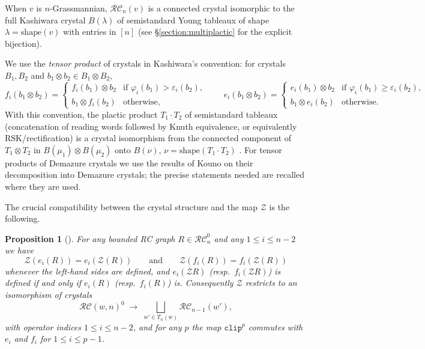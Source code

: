\documentclass{amsart}
\newtheorem{proposition}[lemma]{Proposition}
\theoremstyle{definition}
\theoremstyle{remark}
\numberwithin{equation}{subsection}
\newcommand{\zeromap}{\mathcal{Z}}
\newcommand{\clp}{\mathtt{clip}}
\newcommand{\RC}{\mathcal{RC}}
\begin{document}
When $v$ is $n$-Grassmannian, $\RC_n(v)$ is a connected crystal isomorphic to the full Kashiwara crystal $B(\lambda)$ of semistandard Young tableaux of shape $\lambda=\mathrm{shape}(v)$ with entries in $[n]$ (see \S\ref{section:multiplactic} for the explicit bijection).

We use the \emph{tensor product} of crystals in Kashiwara's convention: for crystals $B_1,B_2$ and $b_1\otimes b_2\in B_1\otimes B_2$,
\begin{equation}\label{eq:tensorrule}
f_i(b_1\otimes b_2) = \begin{cases} f_i(b_1)\otimes b_2 & \text{if }\varphi_i(b_1)>\varepsilon_i(b_2),\\ b_1\otimes f_i(b_2) & \text{otherwise,}\end{cases}
\qquad
e_i(b_1\otimes b_2) = \begin{cases} e_i(b_1)\otimes b_2 & \text{if }\varphi_i(b_1)\geq\varepsilon_i(b_2),\\ b_1\otimes e_i(b_2) & \text{otherwise.}\end{cases}
\end{equation}
With this convention, the plactic product $T_1\cdot T_2$ of semistandard tableaux (concatenation of reading words followed by Knuth equivalence, or equivalently RSK/rectification) is a crystal isomorphism from the connected component of $T_1\otimes T_2$ in $B(\mu_1)\otimes B(\mu_2)$ onto $B(\nu)$, $\nu=\mathrm{shape}(T_1\cdot T_2)$ \cite{kashiwara1993crystal,littelmann1995crystal}. For tensor products of Demazure crystals we use the results of Kouno \cite{kouno2020decomposition} on their decomposition into Demazure crystals; the precise statements needed are recalled where they are used.

The crucial compatibility between the crystal structure and the map $\zeromap$ is the following.

\begin{proposition}[{\cite[Corollary~\ref*{B-corollary:crystaliso}]{samuelbialgebra}}] \label{proposition:zerocrystal}
For any bounded RC graph $R\in\RC_n^0$ and any $1\leq i\leq n-2$ we have
$$\zeromap(e_i(R)) = e_i(\zeromap(R))\qquad\text{and}\qquad \zeromap(f_i(R)) = f_i(\zeromap(R))$$
whenever the left-hand sides are defined, and $e_i(\zeromap R)$ (resp.\ $f_i(\zeromap R)$) is defined if and only if $e_i(R)$ (resp.\ $f_i(R)$) is. Consequently $\zeromap$ restricts to an isomorphism of crystals
$$\RC(w,n)^0\;\longrightarrow\;\bigsqcup_{w'\in T_n(w)}\RC_{n-1}(w'),$$
with operator indices $1\leq i\leq n-2$, and for any $p$ the map $\clp^p$ commutes with $e_i$ and $f_i$ for $1\leq i\leq p-1$.
\end{proposition}
\end{document}
